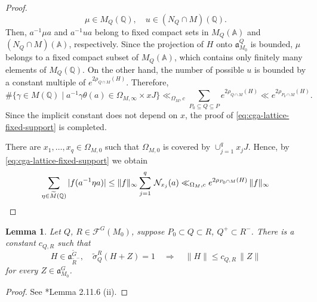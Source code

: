 \documentclass[12pt]{amsart}
\theoremstyle{definition}
\theoremstyle{plain}
\newtheorem{lemma}[definition]{Lemma}
\theoremstyle{remark}
\def\Q{\mathbb{Q}}%
\def\A{\mathbb{A}}%
\def\inf{\infty}
\DeclareMathOperator{\vol}{vol}%
\newcommand{\fa}{\mathfrak{a}}
\newcommand{\cF}{\mathcal{F}}
\numberwithin{equation}{section}
\newcommand{\tG}{\widetilde{G}}
\newcommand{\tM}{\widetilde{M}}
\newcommand{\tR}{\widetilde{R}}
\newcommand{\level}{\operatorname{level}}
\begin{document}
\begin{proof}
\[ \mu\in M_Q(\Q),\quad u\in(N_Q\cap M)(\Q).
\]
Then, $a^{-1}\mu a$ and $a^{-1}ua$ belong to fixed compact
sets in $M_Q(\A)$ and $(N_Q\cap M)(\A)$, respectively.
Since the projection of $H$ onto $\fa_{M_0}^Q$ is bounded,
$\mu$ belongs to a fixed compact subset of $M_Q(\A)$, which contains only finitely many elements of
$M_Q(\Q)$.
On the other hand, the number of possible $u$ is bounded by a constant multiple of $e^{2\rho_{Q\cap M}(H)}$. 
Therefore,
\[
       \#\{\gamma\in M(\Q)\mid
       a^{-1}\gamma \theta(a)\in \Omega_{M,\infty}\times xJ\} \ll_{\Omega_M,c} \sum_{P_0\subseteq Q\subseteq P}e^{2\rho_{Q\cap M}(H)} \ll e^{2\rho_{P_0\cap M}(H)}.
\]
Since the implicit constant does not depend on $x$, the proof of \eqref{eq:cga-lattice-fixed-support} is completed.


There are $x_1,\dots,x_q\in \Omega_{M,0}$ such that $\Omega_{M,0}$ is covered by $ \cup_{j=1}^q  x_j J$. 
Hence, by \eqref{eq:cga-lattice-fixed-support} we obtain
\[
\sum_{\eta\in\tM(\Q)}|f(a^{-1}\eta a)| \le   \|f \|_\inf \sum_{ j=1 }^q  \, \mathcal{N}_{x_j}(a)\ll_{\Omega_M,c} e^{2\rho_{P_0\cap M}(H)}\, \|f\|_\inf  \qedhere
\]
\end{proof}




\begin{lemma}\label{lem:cga-cone-fibers}
Let $Q$, $R\in\cF^G(M_0)$, suppose $P_0\subset Q\subset R$, $Q^+\subset R^-$. 
There is a constant $c_{Q,R}$ such that
\begin{equation*}
 H\in \fa_{\tR^-}^{\tG},\quad \widetilde\sigma_Q^R(H+Z)=1
       \quad\Longrightarrow\quad \|H\|\leq c_{Q,R}\, \|Z\|
\end{equation*}
for every $Z\in \fa_{M_0}^G$.
\end{lemma}
\begin{proof}
See \cite{LW13}*{Lemma 2.11.6 (ii)}.
\end{proof}
\end{document}
